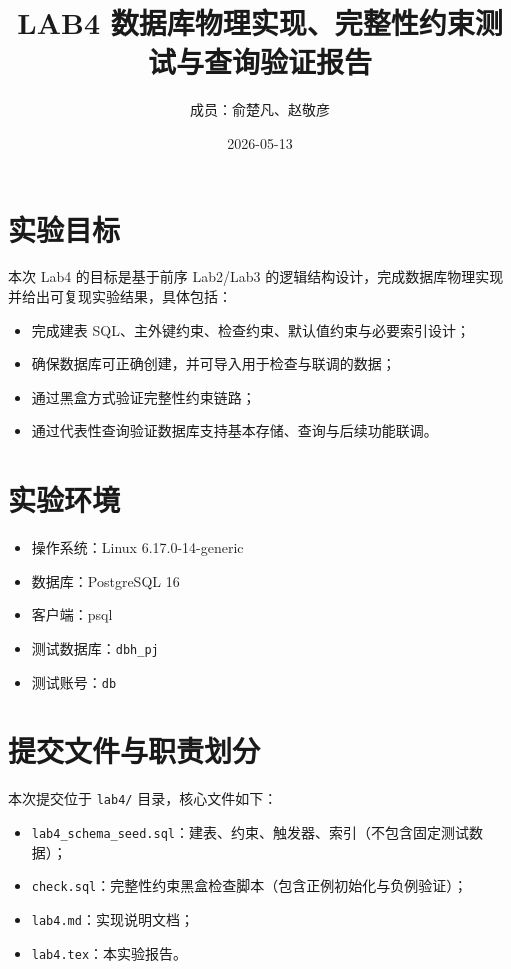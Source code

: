 \documentclass[11pt, a4paper]{article}
\title{LAB4 数据库物理实现、完整性约束测试与查询验证报告}
\author{成员：俞楚凡、赵敬彦}
\date{2026-05-13}
\begin{document}
\maketitle

\section{实验目标}

本次 Lab4 的目标是基于前序 Lab2/Lab3 的逻辑结构设计，完成数据库物理实现并给出可复现实验结果，具体包括：
\begin{itemize}
    \item 完成建表 SQL、主外键约束、检查约束、默认值约束与必要索引设计；
    \item 确保数据库可正确创建，并可导入用于检查与联调的数据；
    \item 通过黑盒方式验证完整性约束链路；
    \item 通过代表性查询验证数据库支持基本存储、查询与后续功能联调。
\end{itemize}

\section{实验环境}

\begin{itemize}
    \item 操作系统：Linux 6.17.0-14-generic
    \item 数据库：PostgreSQL 16
    \item 客户端：psql
    \item 测试数据库：\texttt{dbh\_pj}
    \item 测试账号：\texttt{db}
\end{itemize}

\section{提交文件与职责划分}

本次提交位于 \texttt{lab4/} 目录，核心文件如下：
\begin{itemize}
    \item \texttt{lab4\_schema\_seed.sql}：建表、约束、触发器、索引（不包含固定测试数据）；
    \item \texttt{check.sql}：完整性约束黑盒检查脚本（包含正例初始化与负例验证）；
    \item \texttt{lab4.md}：实现说明文档；
    \item \texttt{lab4.tex}：本实验报告。
\end{itemize}
\end{document}
